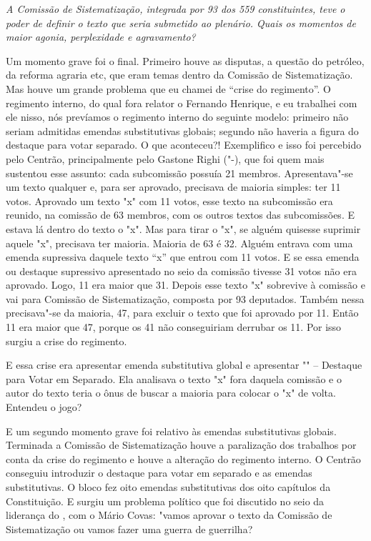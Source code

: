 \medskip

\noindent\emph{A Comissão de Sistematização, integrada por 93 dos 559
constituintes, teve o poder de definir o texto que seria submetido ao
plenário. Quais os momentos de maior agonia, perplexidade e
agravamento?}

Um momento grave foi o final. Primeiro houve as
disputas, a questão do petróleo, da reforma agraria etc, que eram temas
dentro da Comissão de Sistematização. Mas houve um grande problema que
eu chamei de ``crise do regimento''. O regimento interno, do qual fora
relator o Fernando Henrique, e eu trabalhei com ele nisso, nós prevíamos
o regimento interno do seguinte modelo: primeiro não seriam admitidas
emendas substitutivas globais; segundo não haveria a figura do destaque
para votar separado. O que aconteceu?! Exemplifico e isso foi percebido
pelo Centrão, principalmente pelo Gastone Righi ("-), que foi quem
mais sustentou esse assunto: cada subcomissão possuía 21 membros.
Apresentava"-se um texto qualquer e, para ser aprovado, precisava de
maioria simples: ter 11 votos. Aprovado um texto "x" com 11 votos, esse
texto na subcomissão era reunido, na comissão de 63 membros, com os
outros textos das subcomissões. E estava lá dentro do texto o "x". Mas
para tirar o "x", se alguém quisesse suprimir aquele "x", precisava ter
maioria. Maioria de 63 é 32. Alguém entrava com uma emenda supressiva
daquele texto ``x'' que entrou com 11 votos. E se essa emenda ou
destaque supressivo apresentado no seio da comissão tivesse 31 votos não
era aprovado. Logo, 11 era maior que 31. Depois esse texto "x" sobrevive
à comissão e vai para Comissão de Sistematização, composta por 93
deputados. Também nessa precisava"-se da maioria, 47, para excluir o
texto que foi aprovado por 11. Então 11 era maior que 47, porque os 41
não conseguiriam derrubar os 11. Por isso surgiu a crise do regimento.

E essa crise era apresentar emenda substitutiva global e apresentar
"" -- Destaque para Votar em Separado. Ela analisava o texto "x" fora
daquela comissão e o autor do texto teria o ônus de buscar a maioria
para colocar o "x" de volta. Entendeu o jogo?

E um segundo momento grave foi relativo às emendas substitutivas
globais. Terminada a Comissão de Sistematização houve a paralização dos
trabalhos por conta da crise do regimento e houve a alteração do
regimento interno. O Centrão conseguiu introduzir o destaque para votar
em separado e as emendas substitutivas. O bloco fez oito emendas
substitutivas dos oito capítulos da Constituição. E surgiu um problema
político que foi discutido no seio da liderança do , com o Mário
Covas: "vamos aprovar o texto da Comissão de Sistematização ou vamos
fazer uma guerra de guerrilha?

